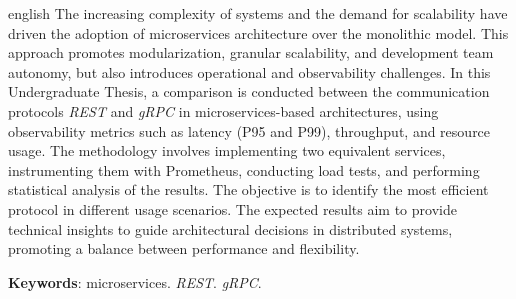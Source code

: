 \begin{resumo}[Abstract]
	\SingleSpacing
	\begin{otherlanguage*}{english}
		The increasing complexity of systems and the demand for scalability have driven the adoption of microservices architecture over the monolithic model. This approach promotes modularization, granular scalability, and development team autonomy, but also introduces operational and observability challenges. In this Undergraduate Thesis, a comparison is conducted between the communication protocols \textit{REST} and \textit{gRPC} in microservices-based architectures, using observability metrics such as latency (P95 and P99), throughput, and resource usage. The methodology involves implementing two equivalent services, instrumenting them with Prometheus, conducting load tests, and performing statistical analysis of the results. The objective is to identify the most efficient protocol in different usage scenarios. The expected results aim to provide technical insights to guide architectural decisions in distributed systems, promoting a balance between performance and flexibility.
		
		\textbf{Keywords}: microservices. \textit{REST}. \textit{gRPC}.
	\end{otherlanguage*}
\end{resumo}